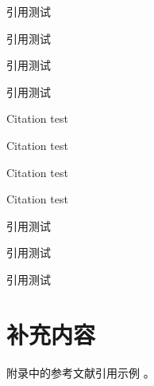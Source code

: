 \documentclass[degree=doctor]{thuthesis}
\begin{document}
\START
\showoutput

引用\cite{zhangkun1994}测试\par
引用\cite[42]{zhangkun1994}测试\par
引用\cite[见][]{zhukezhen1973}测试\par
引用\cite[见][42]{zhukezhen1973}测试\par

Citation \cite{dupont1974bone} test\par
Citation \cite[42]{dupont1974bone} test\par
Citation \cite[see][]{zhengkaiqing1987} test\par
Citation \cite[see][42]{zhengkaiqing1987} test\par

引用\cite{zhangkun1994}测试\par
引用\cite{zhukezhen1973,dupont1974bone}测试\par
引用\cite{zhengkaiqing1987,jiangxizhou1980,jianduju1994}测试\par

\nocite{*}

\printbibliography


\appendix

\chapter{补充内容}

附录\cite{dupont1974bone}中的参考文献引用\cite{zhengkaiqing1987}示例
\cite{dupont1974bone,zhengkaiqing1987}。

\printbibliography

\clearpage
\OMIT
\end{document}
